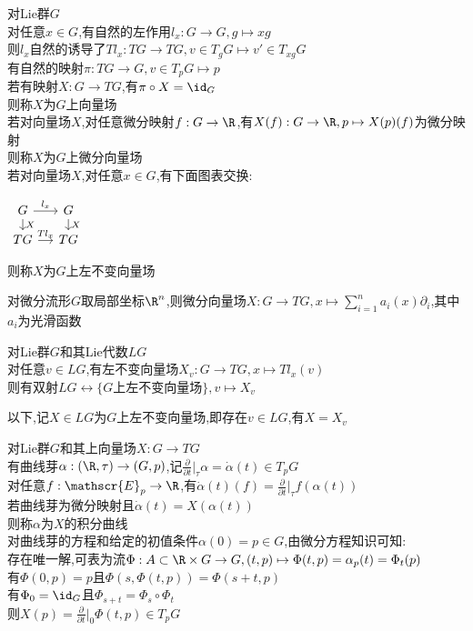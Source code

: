 \begin{dingyi}
对Lie群$G$\\
对任意$x\in G$,有自然的左作用$l_{x}:G\to G,g\mapsto xg$\\
则$l_{x}$自然的诱导了$Tl_{x}:TG\to TG,v\in T_{g}G\mapsto v'\in T_{xg}G$\\
有自然的映射$\pi:TG\to G,v\in T_{p}G\mapsto p$\\
若有映射$X:G\to TG$,有$\pi\circ X=\id_{G}$\\
则称$X$为$G$上向量场\\
若对向量场$X$,对任意微分映射$f:G\to \R$,有$X(f):G\to \R,p\mapsto X(p)(f)$为微分映射\\
则称$X$为$G$上微分向量场\\
若对向量场$X$,对任意$x\in G$,有下面图表交换:
\begin{center}
    $\begin{tikzcd}[column sep=small, row sep=small]
    G \ar[r,"l_{x}"] \ar[d,"X"] & G \ar[d,"X"] \\
    TG \ar[r,"Tl_{x}"] & TG
    \end{tikzcd}$
\end{center}
则称$X$为$G$上左不变向量场
\end{dingyi}

\begin{zhu}
对微分流形$G$取局部坐标$\R^n$,则微分向量场$X:G\to TG,x\mapsto\sum\limits_{i=1}^{n}a_{i}(x)\partial_{i}$,其中$a_i$为光滑函数
\end{zhu}

\begin{dingli}
对Lie群$G$和其Lie代数$LG$\\
对任意$v\in LG$,有左不变向量场$X_{v}:G\to TG,x\mapsto Tl_{x}(v)$\\
则有双射$LG\longleftrightarrow \{G\text{上左不变向量场}\},v\mapsto X_{v}$
\end{dingli}

\begin{zhu}
以下,记$X\in LG$为$G$上左不变向量场,即存在$v\in LG$,有$X=X_v$
\end{zhu}

\begin{dingyi}
对Lie群$G$和其上向量场$X:G\to TG$\\
有曲线芽$\alpha:(\R,\tau)\to (G,p)$,记$\frac{\partial}{\partial t}|_{\tau}\alpha=\dot{\alpha}(t)\in T_{p}G$\\
对任意$f:\mathscr{E}_{p}\to \R$,有$\dot{\alpha}(t)(f)=\frac{\partial}{\partial t}|_{\tau} f(\alpha(t))$\\
若曲线芽为微分映射且$\dot{\alpha}(t)=X(\alpha(t))$\\
则称$\alpha$为$X$的积分曲线\\
对曲线芽的方程和给定的初值条件$\alpha(0)=p\in G$,由微分方程知识可知:\\
存在唯一解,可表为流$\Phi:A\subset \R\times G\to G,(t,p)\mapsto \Phi(t,p)=\alpha_{p}(t)=\Phi_{t}(p)$\\
有$\Phi(0,p)=p$且$\Phi(s,\Phi(t,p))=\Phi(s+t,p)$\\
有$\Phi_{0}=\id_{G}$且$\Phi_{s+t}=\Phi_{s}\circ\Phi_{t}$\\
则$X(p)=\frac{\partial}{\partial t}|_{0}\Phi(t,p)\in T_{p}G$
\end{dingyi}

